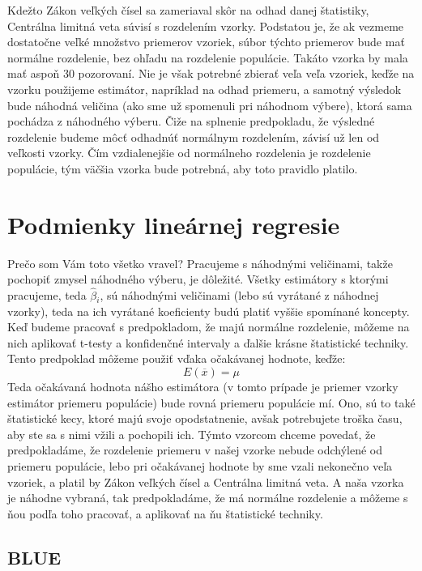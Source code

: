 Kdežto Zákon veľkých čísel sa zameriaval skôr na odhad danej štatistiky,
Centrálna limitná veta súvisí s rozdelením vzorky. Podstatou je, že ak
vezmeme dostatočne veľké množstvo priemerov vzoriek, súbor týchto
priemerov bude mať normálne rozdelenie, bez ohľadu na rozdelenie
populácie. Takáto vzorka by mala mať aspoň 30 pozorovaní. Nie je však
potrebné zbierať veľa veľa vzoriek, keďže na vzorku použijeme estimátor,
napríklad na odhad priemeru, a samotný výsledok bude náhodná veličina
(ako sme už spomenuli pri náhodnom výbere), ktorá sama pochádza z
náhodného výberu. Čiže na splnenie predpokladu, že výsledné rozdelenie
budeme môcť odhadnúť normálnym rozdelením, závisí už len od veľkosti
vzorky. Čím vzdialenejšie od normálneho rozdelenia je rozdelenie
populácie, tým väčšia vzorka bude potrebná, aby toto pravidlo platilo.

\newpage

\hypertarget{podmienky-lineuxe1rnej-regresie}{%
\section{Podmienky lineárnej
regresie}\label{podmienky-lineuxe1rnej-regresie}}

Prečo som Vám toto všetko vravel? Pracujeme s náhodnými veličinami,
takže pochopiť zmysel náhodného výberu, je dôležité. Všetky estimátory s
ktorými pracujeme, teda \(\hat\beta{}_i\), sú náhodnými veličinami (lebo
sú vyrátané z náhodnej vzorky), teda na ich vyrátané koeficienty budú
platiť vyššie spomínané koncepty. Keď budeme pracovať s predpokladom, že
majú normálne rozdelenie, môžeme na nich aplikovať t-testy a konfidenčné
intervaly a ďalšie krásne štatistické techniky. Tento predpoklad môžeme
použiť vďaka očakávanej hodnote, keďže:
\[E(\overline{x}) = \mu\] Teda očakávaná hodnota nášho estimátora (v
tomto prípade je priemer vzorky estimátor priemeru populácie) bude rovná
priemeru populácie mí. Ono, sú to také štatistické kecy, ktoré majú
svoje opodstatnenie, avšak potrebujete troška času, aby ste sa s nimi
vžili a pochopili ich. Týmto vzorcom chceme povedať, že predpokladáme,
že rozdelenie priemeru v našej vzorke nebude odchýlené od priemeru
populácie, lebo pri očakávanej hodnote by sme vzali nekonečno veľa
vzoriek, a platil by Zákon veľkých čísel a Centrálna limitná veta. A
naša vzorka je náhodne vybraná, tak predpokladáme, že má normálne
rozdelenie a môžeme s ňou podľa toho pracovať, a aplikovať na ňu
štatistické techniky.

\hypertarget{blue}{%
\subsection{BLUE}\label{blue}}

